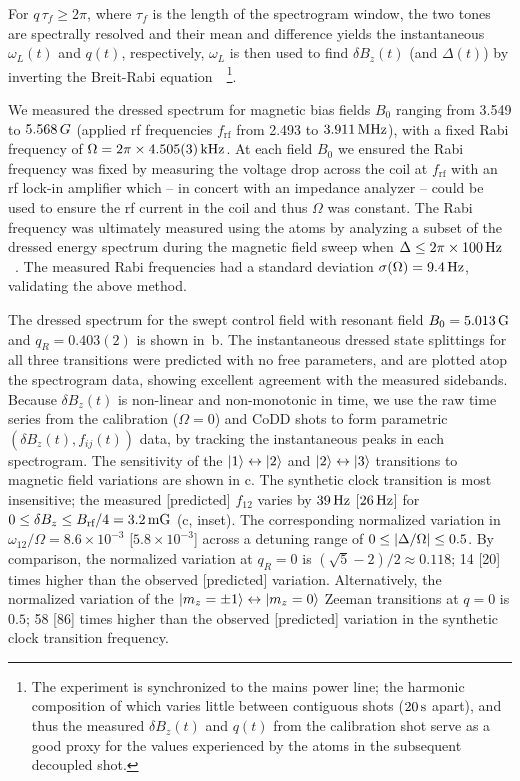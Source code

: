 \documentclass[aps,prl,reprint,superscriptaddress,floatfix]{revtex4-1}
\begin{document}
For $q \, \tau_f \geq 2\pi$, where $\tau_f$ is the length of the spectrogram window, the two tones are spectrally resolved and their mean and difference yields the instantaneous $\omega_L(t)$ and $q(t)$, respectively, $\omega_{L}$ is then used to find $\delta B_z(t)$ (and $\Delta(t)$) by inverting the Breit-Rabi equation~\cite{ramsey_molecular_1956}~\footnote{
    The experiment is synchronized to the mains power line; the harmonic composition of which varies little between contiguous shots ($\unit[20]{s}$ apart), and thus the measured $\delta B_z(t)$ and $q(t)$ from the calibration  shot serve as a good proxy for the values experienced by the atoms in the subsequent decoupled shot.
}.

We measured the dressed spectrum for magnetic bias fields $B_0$ ranging from 3.549 to $\unit[5.568]\unit{G}$ (applied rf frequencies $f_{\text{rf}}$ from 2.493 to $\unit[3.911]{MHz}$), with a fixed Rabi frequency of $\Omega = 2\pi\times\unit[4.505(3)]{kHz}$.
At each field $B_0$ we ensured the Rabi frequency was fixed by measuring the voltage drop across the coil at $f_{\text{rf}}$ with an rf lock-in amplifier which -- in concert with an impedance analyzer -- could be used to ensure the rf current in the coil and thus $\Omega$ was constant.
The Rabi frequency was ultimately measured using the atoms by analyzing a subset of the dressed energy spectrum during the magnetic field sweep when $\Delta \leq 2\pi\times\unit[100]{Hz}$~.
The measured Rabi frequencies had a standard deviation $\sigma(\Omega) = \unit[9.4]{Hz}$, validating the above method.

The dressed spectrum for the swept control field with resonant field $B_0=\unit[5.013]{G}$ and $q_R=0.403(2)$ is shown in~b.
The instantaneous dressed state splittings for all three transitions were predicted with no free parameters, and are plotted atop the spectrogram data, showing excellent agreement with the measured sidebands.
Because $\delta B_z(t)$ is non-linear and non-monotonic in time, we use the raw time series from the calibration ($\Omega=0$) and CoDD shots to form parametric $(\delta B_z(t), f_{ij}(t))$ data, by tracking the instantaneous peaks in each spectrogram.
The sensitivity of the $\vert 1 \rangle  \leftrightarrow \vert 2 \rangle $ and $\vert 2 \rangle  \leftrightarrow \vert 3 \rangle $ transitions to magnetic field variations are shown in c.
The synthetic clock transition is most insensitive; the measured [predicted] $f_{12}$ varies by $\unit[39]{Hz}$ [$\unit[26]{Hz}$] for $0 \leq \delta B_z \leq B_{\text{rf}}/4 = \unit[3.2]{mG}$ (c, inset).
The corresponding normalized variation in $\omega_{12}/\Omega = 8.6\times10^{-3}$ [$5.8\times10^{-3}$] across a detuning range of $0 \leq \vert \Delta/\Omega \vert  \leq 0.5$.
By comparison, the normalized variation at $q_R=0$ is $(\sqrt{5}-2)/2 \approx 0.118$; 14 [20] times higher than the observed [predicted] variation.
Alternatively, the normalized variation of the $\vert m_z=\pm1 \rangle  \leftrightarrow \vert m_z = 0 \rangle $ Zeeman transitions at $q=0$ is $0.5$; 58 [86] times higher than the observed [predicted] variation in the synthetic clock transition frequency.
\end{document}
